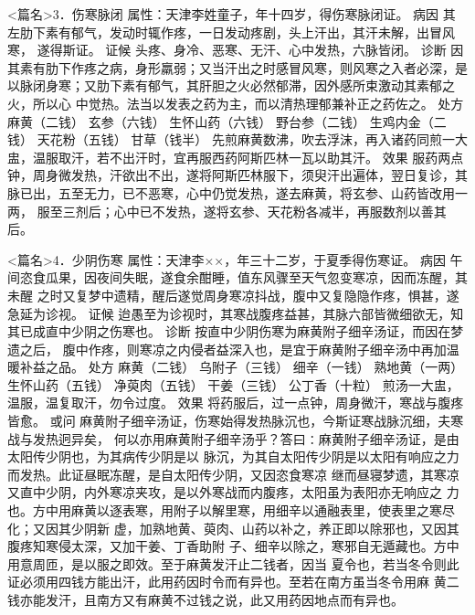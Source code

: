 \documentclass[a4paper,12pt,UTF8,twoside]{ctexbook}
\begin{document}
<篇名>3．伤寒脉闭
属性：天津李姓童子，年十四岁，得伤寒脉闭证。 
病因 其左肋下素有郁气，发动时辄作疼，一日发动疼剧，头上汗出，其汗未解，出冒风寒， 
遂得斯证。 
证候 头疼、身冷、恶寒、无汗、心中发热，六脉皆闭。 
诊断 因其素有肋下作疼之病，身形羸弱；又当汗出之时感冒风寒，则风寒之入者必深，是 
以脉闭身寒；又肋下素有郁气，其肝胆之火必然郁滞，因外感所束激动其素郁之火，所以心 
中觉热。法当以发表之药为主，而以清热理郁兼补正之药佐之。 
处方 麻黄（二钱） 玄参（六钱） 生怀山药（六钱） 野台参（二钱） 
生鸡内金（二钱） 天花粉（五钱） 甘草（钱半） 
先煎麻黄数沸，吹去浮沫，再入诸药同煎一大盅，温服取汗，若不出汗时，宜再服西药阿斯匹林一瓦以助其汗。 
效果 服药两点钟，周身微发热，汗欲出不出，遂将阿斯匹林服下，须臾汗出遍体，翌日复诊，其 
脉已出，五至无力，已不恶寒，心中仍觉发热，遂去麻黄，将玄参、山药皆改用一两， 
服至三剂后；心中已不发热，遂将玄参、天花粉各减半，再服数剂以善其后。 


<篇名>4．少阴伤寒
属性：天津李××，年三十二岁，于夏季得伤寒证。 
病因 午间恣食瓜果，因夜间失眠，遂食余酣睡，值东风骤至天气忽变寒凉，因而冻醒，其未醒 
之时又复梦中遗精，醒后遂觉周身寒凉抖战，腹中又复隐隐作疼，惧甚，遂急延为诊视。 
证候 迨愚至为诊视时，其寒战腹疼益甚，其脉六部皆微细欲无，知其已成直中少阴之伤寒也。 
诊断 按直中少阴伤寒为麻黄附子细辛汤证，而因在梦遗之后， 
腹中作疼，则寒凉之内侵者益深入也，是宜于麻黄附子细辛汤中再加温暖补益之品。 
处方 麻黄（二钱） 乌附子（三钱） 细辛（一钱） 熟地黄（一两） 
生怀山药（五钱） 净萸肉（五钱） 干姜（三钱） 公丁香（十粒） 
煎汤一大盅，温服，温复取汗，勿令过度。 
效果 将药服后，过一点钟，周身微汗，寒战与腹疼皆愈。 
或问 麻黄附子细辛汤证，伤寒始得发热脉沉也，今斯证寒战脉沉细，夫寒战与发热迥异矣， 
何以亦用麻黄附子细辛汤乎？答曰∶麻黄附子细辛汤证，是由太阳传少阴也，为其病传少阴是以 
脉沉，为其自太阳传少阴是以太阳有响应之力而发热。此证昼眠冻醒，是自太阳传少阴，又因恣食寒凉 
继而昼寝梦遗，其寒凉又直中少阴，内外寒凉夹攻，是以外寒战而内腹疼，太阳虽为表阳亦无响应之 
力也。方中用麻黄以逐表寒，用附子以解里寒，用细辛以通融表里，使表里之寒尽化；又因其少阴新 
虚，加熟地黄、萸肉、山药以补之，养正即以除邪也，又因其腹疼知寒侵太深，又加干姜、丁香助附 
子、细辛以除之，寒邪自无遁藏也。方中用意周匝，是以服之即效。至于麻黄发汗止二钱者，因当 
夏令也，若当冬令则此证必须用四钱方能出汗，此用药因时令而有异也。至若在南方虽当冬令用麻 
黄二钱亦能发汗，且南方又有麻黄不过钱之说，此又用药因地点而有异也。 
\end{document}
